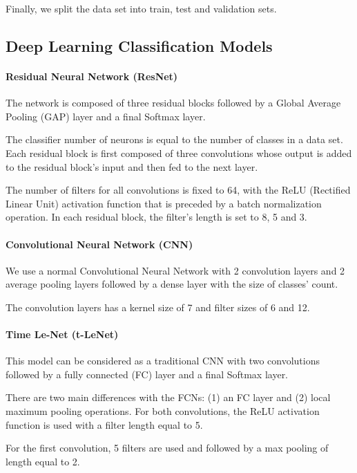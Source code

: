 \documentclass[conference]{IEEEtran}
\begin{document}
Finally, we split the data set into train, test and validation sets.

\subsection{Deep Learning Classification Models}\label{sub:DLCM}
\paragraph{Residual Neural Network (ResNet)}
The network \cite{Wang2017} is composed of three residual blocks followed by a Global Average Pooling (GAP) layer and a final Softmax layer. 

The classifier number of neurons is equal to the number of classes in a data set. Each residual block is first composed of three convolutions whose output is added to the residual block’s input and then fed to the next layer. 

The number of filters for all convolutions is fixed to 64, with the ReLU (Rectified Linear Unit) activation function that is preceded by a batch normalization operation. In each residual block, the filter’s length is set to 8, 5 and 3.

\paragraph{Convolutional Neural Network (CNN)}
We use a normal Convolutional Neural Network \cite{Krizhevsky2012} with 2 convolution layers and 2 average pooling layers followed by a dense layer with the size of classes' count. 

The convolution layers has a kernel size of 7 and filter sizes of 6 and 12.

\paragraph{Time Le-Net (t-LeNet)}
This model \cite{leguennec:halshs-01357973} can be considered as a traditional CNN with two convolutions followed by a fully connected (FC) layer and a final Softmax layer.

There are two main differences with the FCNs: (1) an FC layer and (2) local maximum pooling operations. For both convolutions, the ReLU activation function is used with a filter length equal to 5. 

For the first convolution, 5 filters are used and followed by a max pooling of length equal to 2. 
\end{document}
